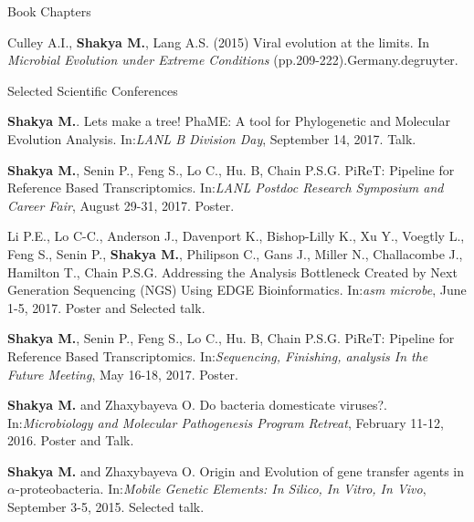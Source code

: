 \documentclass{resume} %
\begin{document}
\begin{rSection}{Book Chapters}
\item Culley A.I., \textbf{Shakya M.}, Lang A.S. (2015) Viral evolution at the limits. In \textit{Microbial Evolution under Extreme Conditions} (pp.209-222).Germany.degruyter.
\end{rSection}



\begin{rSection}{Selected Scientific Conferences}

\item \textbf{Shakya M.}. Lets make a tree! PhaME: A tool for Phylogenetic and Molecular Evolution Analysis. In:\emph{LANL B Division Day}, September 14, 2017. Talk.

\item \textbf{Shakya M.}, Senin P., Feng S., Lo C., Hu. B, Chain P.S.G. PiReT: Pipeline for Reference Based Transcriptomics. In:\emph{LANL Postdoc Research Symposium and Career Fair}, August 29-31, 2017.  Poster.

\item Li P.E., Lo C-C., Anderson J., Davenport K., Bishop-Lilly K., Xu Y., Voegtly L., Feng S., Senin P., \textbf{Shakya M.}, Philipson C., Gans J., Miller N., Challacombe J., Hamilton T., Chain P.S.G. Addressing the Analysis Bottleneck Created by Next Generation Sequencing (NGS) Using EDGE Bioinformatics. In:\emph{asm microbe}, June 1-5, 2017. Poster and Selected talk.

\item \textbf{Shakya M.}, Senin P., Feng S., Lo C., Hu. B, Chain P.S.G. PiReT: Pipeline for Reference Based Transcriptomics. In:\emph{Sequencing, Finishing, analysis In the Future Meeting}, May 16-18, 2017. Poster.

\item \textbf{Shakya M.} and Zhaxybayeva O. Do bacteria domesticate viruses?. In:\emph{Microbiology and Molecular Pathogenesis Program Retreat}, February 11-12, 2016. Poster and Talk.

\item \textbf{Shakya M.} and Zhaxybayeva O. Origin and Evolution of gene transfer agents in $\alpha$-proteobacteria. In:\emph{Mobile Genetic Elements: In Silico, In Vitro, In Vivo}, September 3-5, 2015. Selected talk.


\end{rSection}
\end{document}
